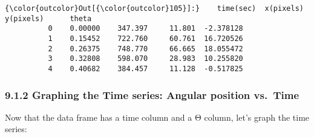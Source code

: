 \documentclass{article}
\begin{document}
            \begin{Verbatim}[commandchars=\\\{\}]
{\color{outcolor}Out[{\color{outcolor}105}]:}    time(sec)  x(pixels)  y(pixels)      theta
          0    0.00000    347.397     11.801  -2.378128
          1    0.15452    722.760     60.761  16.720526
          2    0.26375    748.770     66.665  18.055472
          3    0.32808    598.070     28.983  10.255820
          4    0.40682    384.457     11.128  -0.517825
\end{Verbatim}
        

    \subsubsection{9.1.2 Graphing the Time series: Angular position vs.~Time}


    Now that the data frame has a time column and a Θ column, let's graph
the time series: 
\end{document}
